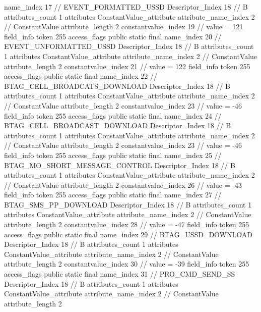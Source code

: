 {{{{{				name_index	17		// EVENT_FORMATTED_USSD
				Descriptor_Index	18		// B
				attributes_count	1
				attributes {
				ConstantValue_attribute {
					attribute_name_index	2		// ConstantValue
					attribute_length	2
					constantvalue_index	19		// value = 121
				}
				}
			}
			field_info {
				token	255
				access_flags	public static final
				name_index	20		// EVENT_UNFORMATTED_USSD
				Descriptor_Index	18		// B
				attributes_count	1
				attributes {
				ConstantValue_attribute {
					attribute_name_index	2		// ConstantValue
					attribute_length	2
					constantvalue_index	21		// value = 122
				}
				}
			}
			field_info {
				token	255
				access_flags	public static final
				name_index	22		// BTAG_CELL_BROADCATS_DOWNLOAD
				Descriptor_Index	18		// B
				attributes_count	1
				attributes {
				ConstantValue_attribute {
					attribute_name_index	2		// ConstantValue
					attribute_length	2
					constantvalue_index	23		// value = -46
				}
				}
			}
			field_info {
				token	255
				access_flags	public static final
				name_index	24		// BTAG_CELL_BROADCAST_DOWNLOAD
				Descriptor_Index	18		// B
				attributes_count	1
				attributes {
				ConstantValue_attribute {
					attribute_name_index	2		// ConstantValue
					attribute_length	2
					constantvalue_index	23		// value = -46
				}
				}
			}
			field_info {
				token	255
				access_flags	public static final
				name_index	25		// BTAG_MO_SHORT_MESSAGE_CONTROL
				Descriptor_Index	18		// B
				attributes_count	1
				attributes {
				ConstantValue_attribute {
					attribute_name_index	2		// ConstantValue
					attribute_length	2
					constantvalue_index	26		// value = -43
				}
				}
			}
			field_info {
				token	255
				access_flags	public static final
				name_index	27		// BTAG_SMS_PP_DOWNLOAD
				Descriptor_Index	18		// B
				attributes_count	1
				attributes {
				ConstantValue_attribute {
					attribute_name_index	2		// ConstantValue
					attribute_length	2
					constantvalue_index	28		// value = -47
				}
				}
			}
			field_info {
				token	255
				access_flags	public static final
				name_index	29		// BTAG_USSD_DOWNLOAD
				Descriptor_Index	18		// B
				attributes_count	1
				attributes {
				ConstantValue_attribute {
					attribute_name_index	2		// ConstantValue
					attribute_length	2
					constantvalue_index	30		// value = -39
				}
				}
			}
			field_info {
				token	255
				access_flags	public static final
				name_index	31		// PRO_CMD_SEND_SS
				Descriptor_Index	18		// B
				attributes_count	1
				attributes {
				ConstantValue_attribute {
					attribute_name_index	2		// ConstantValue
					attribute_length	2
}}}}}}}
